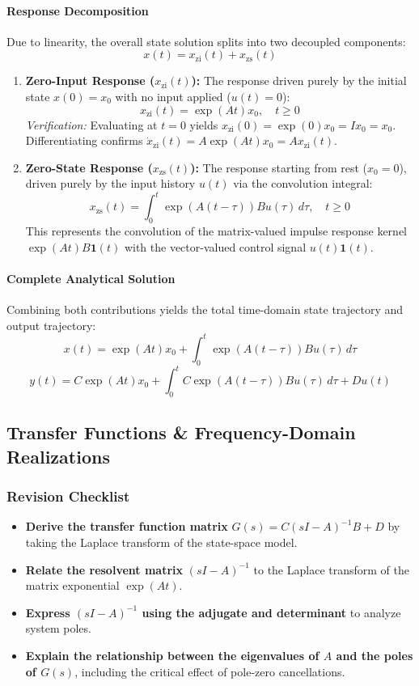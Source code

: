 \documentclass[12pt,onecolumn,twoside ]{article}
\begin{document}
	\paragraph{Response Decomposition}
	Due to linearity, the overall state solution splits into two decoupled components: \[
	x(t) = x_{\text{zi}}(t) + x_{\text{zs}}(t)
	\]
	\begin{enumerate}
		\item
		\textbf{Zero-Input Response ($x_{\text{zi}}(t)$):} The response driven purely by the initial state $x(0) = x_0$ with no input applied ($u(t) = 0$): \[
		x_{\text{zi}}(t) = \exp(At)x_0, \quad t \ge 0
		\] \textit{Verification:} Evaluating at $t = 0$ yields $x_{\text{zi}}(0) = \exp(0)x_0 = I x_0 = x_0$. Differentiating confirms $\dot{x}_{\text{zi}}(t) = A\exp(At)x_0 = Ax_{\text{zi}}(t)$.
		\item
		\textbf{Zero-State Response ($x_{\text{zs}}(t)$):} The response starting from rest ($x_0 = 0$), driven purely by the input history $u(t)$ via the convolution integral: \[
		x_{\text{zs}}(t) = \int_{0}^{t} \exp(A(t - \tau))Bu(\tau)\, d\tau, \quad t \ge 0
		\] This represents the convolution of the matrix-valued impulse response kernel $\exp(At)B\mathbf{1}(t)$ with the vector-valued control signal $u(t)\mathbf{1}(t)$.
	\end{enumerate}
	\paragraph{Complete Analytical Solution}
	Combining both contributions yields the total time-domain state trajectory and output trajectory: \[
	x(t) = \exp(At)x_0 + \int_{0}^{t} \exp(A(t - \tau))Bu(\tau)\, d\tau
	\] \[
	y(t) = C\exp(At)x_0 + \int_{0}^{t} C\exp(A(t - \tau))Bu(\tau)\, d\tau + Du(t)
	\]
	
	\subsection{Transfer Functions \& Frequency-Domain Realizations}
	\subsubsection{Revision Checklist}
	\begin{itemize}
		\item[$\square$]
		\textbf{Derive the transfer function matrix} $G(s) = C(sI - A)^{-1}B + D$ by taking the Laplace transform of the state-space model.
		\item[$\square$]
		\textbf{Relate the resolvent matrix} $(sI - A)^{-1}$ to the Laplace transform of the matrix exponential $\exp(At)$.
		\item[$\square$]
		\textbf{Express $(sI - A)^{-1}$ using the adjugate and determinant} to analyze system poles.
		\item[$\square$]
		\textbf{Explain the relationship between the eigenvalues of $A$ and the poles of $G(s)$}, including the critical effect of pole-zero cancellations.
	\end{itemize}
	
\end{document}

